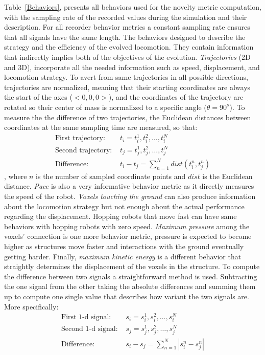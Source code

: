 Table~\ref{Behaviors}, presents all behaviors used for the novelty metric computation, with the sampling rate of the recorded values during the simulation and their description. For all recorder behavior metrics a constant sampling rate ensures that all signals have the same length. The behaviors designed to describe the strategy and the efficiency of the evolved  locomotion. They contain information that indirectly implies both of the objectives of the evolution. \emph{Trajectories} (2D and 3D), incorporate all the needed information such as speed, displacement, and locomotion strategy. To avert from same trajectories in all possible directions, trajectories are normalized, meaning that their starting coordinates are always the start of the axes ($<0,0,0>$), and the coordinates of the trajectory are rotated so their center of mass is normalized to a specific angle ($\theta = 90^{o}$). To measure the the difference of two trajectories, the Euclidean distances between coordinates at the same sampling time are measured, so that:
\begin{align}
\text{First trajectory: } &t_i = t_i^1, t_i^2, \ldots, t_i^N\\
\text{Second trajectory: } &t_j = t_j^1, t_j^2, \ldots, t_j^N\\
\text{Difference: } &t_i - t_j = \sum_{n=1}^{N} dist( t_i^n, t_j^n )
\end{align}
, where $n$ is the number of sampled coordinate points and $dist$ is the Euclidean distance. \emph{Pace} is also a very informative behavior metric as it directly measures the speed of the robot. \emph{Voxels touching the ground} can also produce information about the locomotion strategy but not enough about the actual performance regarding the displacement. Hopping robots that move fast can have same behaviors with hopping robots with zero speed. \emph{Maximum pressure} among the voxels' connection is one more behavior metric, pressure is expected to become higher as structures move faster and interactions with the ground eventually getting harder. Finally, \emph{maximum kinetic energy} is a different behavior that straightly determines the displacement of the voxels in the structure. To compute the difference between two signals a straightforward method is used. Subtracting the one signal from the other taking the absolute differences and summing them up to compute one single value that describes how variant the two signals are. More specifically:
\begin{align}
\text{First 1-d signal: } &s_i = s_i^1, s_i^2, \ldots, s_i^N\\
\text{Second 1-d signal: } &s_j = s_j^1, s_j^2, \ldots, s_j^N\\
\text{Difference: } &s_i - s_j = \sum_{n=1}^{N} | s_i^n - s_j^n |
\end{align}

